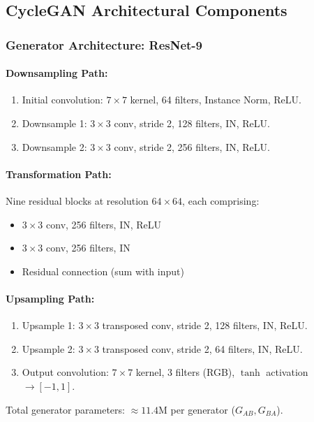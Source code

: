 \documentclass[11pt]{article}
\begin{document}
\subsection{CycleGAN Architectural Components}
\subsubsection{Generator Architecture: ResNet-9}
\paragraph{Downsampling Path:}
\begin{enumerate}
\item Initial convolution: $7 \times 7$ kernel, 64 filters, Instance Norm, ReLU.
\item Downsample 1: $3 \times 3$ conv, stride 2, 128 filters, IN, ReLU.
\item Downsample 2: $3 \times 3$ conv, stride 2, 256 filters, IN, ReLU.
\end{enumerate}

\paragraph{Transformation Path:}
Nine residual blocks at resolution $64 \times 64$, each comprising:
\begin{itemize}
\item $3 \times 3$ conv, 256 filters, IN, ReLU
\item $3 \times 3$ conv, 256 filters, IN
\item Residual connection (sum with input)
\end{itemize}

\paragraph{Upsampling Path:}
\begin{enumerate}
\item Upsample 1: $3 \times 3$ transposed conv, stride 2, 128 filters, IN, ReLU.
\item Upsample 2: $3 \times 3$ transposed conv, stride 2, 64 filters, IN, ReLU.
\item Output convolution: $7 \times 7$ kernel, 3 filters (RGB), $\tanh$ activation $\to [-1,1]$.
\end{enumerate}

Total generator parameters: $\approx 11.4$M per generator ($G_{AB}, G_{BA}$).
\end{document}
